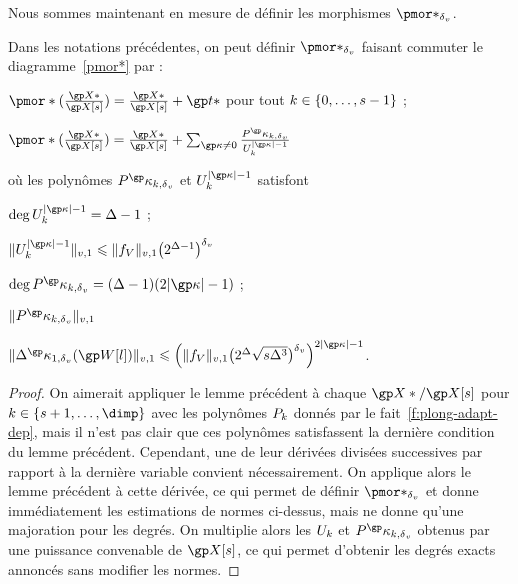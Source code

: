 Nous sommes maintenant en mesure de définir les morphismes \( \pmor*_\dv \).

\begin{lem}
  Dans les notations précédentes, on peut définir \( \pmor*_\dv \) faisant
  commuter le diagramme~\ref{pmor*} par :
  \begin{enumthm}
    \item \( \pmor*(\frac{ \vp* }{ \vp[\anydim] })
        = \frac{ \vp* }{ \vp[\anydim] } + \psp* \)
      pour tout \( k \in \lbrace0, \dots, s-1\rbrace \) ;
    \item \( \pmor*(\frac{ \vp* }{ \vp[\anydim] })
        = \frac{ \vp* }{ \vp[\anydim] }
        + \sum_{\derp \neq 0}
        \frac{ P^\derp_{\ind, \dv} }{ U_\ind^{\lgr\derp - 1} }
      \)
  \end{enumthm}
  où les polynômes \( P^\derp_{\ind, \dv} \) et \(  U_\ind^{\lgr\derp - 1} \)
  satisfont
  \begin{enumthm}
    \item \( \deg U_\ind^{\lgr\derp - 1} = \anydeg - 1 \) ;
    \item \( \nv1{ U_\ind^{\lgr\derp - 1} }
        \le \nv1{ \chow\anyvar } \bigl( 2^{\anydeg-1} \bigr)^\dv
      \)
    \item \( \deg P^\derp_{\ind, \dv} = (\anydeg - 1) (2\lgr\derp - 1) \) ;
    \item \( \nv1{ P^\derp_{\ind, \dv} }
      \)
    \item \( \nv1{ \pmnum^\derp_{1, \dv} (\anyvp[\indi]) }
        \le \left(
          \nv1{ \chow\anyvar }
          \bigl( 2^\anydeg \sqrt{\anydim \anydeg^{3}} \bigr)^\dv
        \right)^{2\lgr\derp - 1} \).
  \end{enumthm}
\end{lem}

\begin{proof}
  On aimerait appliquer le lemme précédent à chaque \( \vp* / \vp[\anydim] \)
  pour \( \ind \in \set{\anydim + 1, \dots, \dimp} \) avec les polynômes \(
    P_k \) donnés par le fait~\ref{f:plong-adapt-dep}, mais il n'est
  pas clair que ces polynômes satisfassent la dernière condition du lemme
  précédent. Cependant, une de leur dérivées divisées successives par rapport
  à la dernière variable convient nécessairement. On applique alors le lemme
  précédent à cette dérivée, ce qui permet de définir \( \pmor*_\dv \) et
  donne immédiatement les estimations de normes ci-dessus, mais ne donne
  qu'une majoration pour les degrés. On multiplie alors les \( U_k \) et \(
    P^\derp_{\ind, \dv} \) obtenus par une puissance convenable de \(
    \vp[\anydim] \), ce qui permet d'obtenir les degrés exacts annoncés sans
  modifier les normes.
\end{proof}

